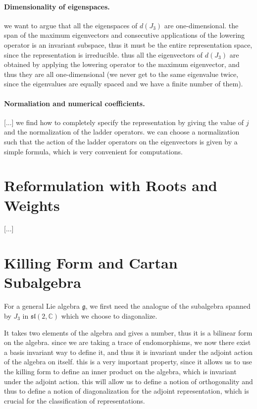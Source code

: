\paragraph{Dimensionality of eigenspaces.} we want to argue that all the eigenspaces of \(d(J_3)\) are one-dimensional. the span of the maximum eigenvectors and consecutive applications of the lowering operator is an invariant subspace, thus it must be the entire representation space, since the representation is irreducible. thus all the eigenvectors of \(d(J_3)\) are obtained by applying the lowering operator to the maximum eigenvector, and thus they are all one-dimensional (we never get to the same eigenvalue twice, since the eigenvalues are equally spaced and we have a finite number of them).

\paragraph{Normaliation and numerical coefficients.} [...] we find how to completely specify the representation by giving the value of \(j\) and the normalization of the ladder operators. we can choose a normalization such that the action of the ladder operators on the eigenvectors is given by a simple formula, which is very convenient for computations.

\section{Reformulation with Roots and Weights}

 [...]

\section{Killing Form and Cartan Subalgebra}

For a general Lie algebra \(\mathfrak{g}\), we first need the analogue of the subalgebra spanned by \(J_3\) in \(\mathfrak{sl}(2,\mathbb{C})\)  which we choose to diagonalize.

\begin{definition}
\end{definition}

It takes two elements of the algebra and gives a number, thus it is a bilinear form on the algebra. since we are taking a trace of endomorphisms, we now there exist a basis invariant way to define it, and thus it is invariant under the adjoint action of the algebra on itself. this is a very important property, since it allows us to use the killing form to define an inner product on the algebra, which is invariant under the adjoint action. this will allow us to define a notion of orthogonality and thus to define a notion of diagonalization for the adjoint representation, which is crucial for the classification of representations.

